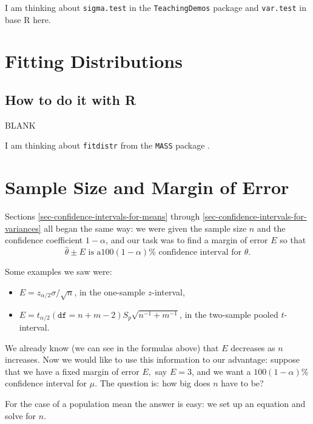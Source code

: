 \documentclass[]{book}
\providecommand{\tightlist}{%
  \setlength{\itemsep}{0pt}\setlength{\parskip}{0pt}}
\numberwithin{equation}{chapter}
\numberwithin{figure}{chapter}
\theoremstyle{plain}
\theoremstyle{definition}
\theoremstyle{remark}
\theoremstyle{definition}
\theoremstyle{definition}
\theoremstyle{remark}
\begin{document}
I am thinking about \texttt{sigma.test} in the \texttt{TeachingDemos}
package \autocite{TeachingDemos} and \texttt{var.test} in base R
\autocite{base} here.

\section{Fitting Distributions}\label{sec-fitting-distributions}

\subsection{How to do it with R}\label{how-to-do-it-with-r-38}

BLANK

I am thinking about \texttt{fitdistr} from the \texttt{MASS} package
\autocite{MASS}.

\section{Sample Size and Margin of Error}\label{sec-Sample-Size-and-moe}

Sections \ref{sec-confidence-intervals-for-means} through
\ref{sec-confidence-intervals-for-variances} all began the same way: we
were given the sample size \(n\) and the confidence coefficient
\(1-\alpha\), and our task was to find a margin of error \(E\) so that
\[ \hat{\theta}\pm E\mbox{ is a
}100(1-\alpha)\%\mbox{ confidence interval for }\theta.  \]

Some examples we saw were:

\begin{itemize}
\tightlist
\item
  \(E=z_{\alpha/2}\sigma/\sqrt{n}\), in the one-sample \(z\)-interval,
\item
  \(E=t_{\alpha/2}(\mathtt{df}=n+m-2)S_{p}\sqrt{n^{-1}+m^{-1}}\), in the
  two-sample pooled \(t\)-interval.
\end{itemize}

We already know (we can see in the formulas above) that \(E\) decreases
as \(n\) increases. Now we would like to use this information to our
advantage: suppose that we have a fixed margin of error \(E,\) say
\(E=3\), and we want a \(100(1-\alpha)\%\) confidence interval for
\(\mu\). The question is: how big does \(n\) have to be?

For the case of a population mean the answer is easy: we set up an
equation and solve for \(n\).

\bigskip
\end{document}
